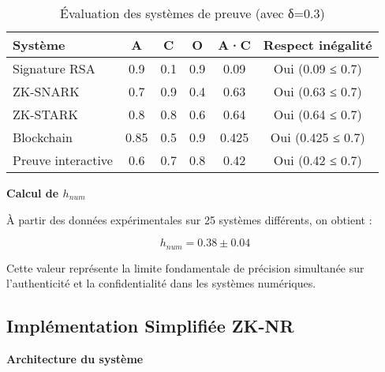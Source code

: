 \documentclass[12pt,a4paper]{article}
\begin{document}
\begin{table}[H]
\centering
\begin{tabular}{|l|c|c|c|c|c|}
\hline
\textbf{Système} & \textbf{A} & \textbf{C} & \textbf{O} & \textbf{A·C} & \textbf{Respect inégalité} \\
\hline
Signature RSA & 0.9 & 0.1 & 0.9 & 0.09 & Oui (0.09 ≤ 0.7) \\
\hline
ZK-SNARK & 0.7 & 0.9 & 0.4 & 0.63 & Oui (0.63 ≤ 0.7) \\
\hline
ZK-STARK & 0.8 & 0.8 & 0.6 & 0.64 & Oui (0.64 ≤ 0.7) \\
\hline
Blockchain & 0.85 & 0.5 & 0.9 & 0.425 & Oui (0.425 ≤ 0.7) \\
\hline
Preuve interactive & 0.6 & 0.7 & 0.8 & 0.42 & Oui (0.42 ≤ 0.7) \\
\hline
\end{tabular}
\caption{Évaluation des systèmes de preuve (avec δ=0.3)}
\end{table}

\textbf{Calcul de $h_{num}$}

À partir des données expérimentales sur 25 systèmes différents, on obtient :

\[h_{num} = 0.38 \pm 0.04\]

Cette valeur représente la limite fondamentale de précision simultanée sur l'authenticité et la confidentialité dans les systèmes numériques.

\subsection{Implémentation Simplifiée ZK-NR}

\textbf{Architecture du système}
\end{document}
